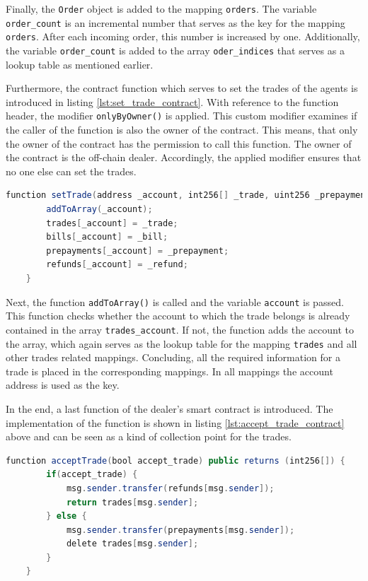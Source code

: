 Finally, the \verb|Order| object is added to the mapping \verb|orders|.
The variable \verb|order_count| is an incremental number that serves as the key for 
the mapping \verb|orders|. After each incoming order, this number is increased by one. 
Additionally, the variable \verb|order_count| is added to the array \verb|oder_indices|
that serves as a lookup table as mentioned earlier.

Furthermore, the contract function which serves to set the trades of the agents is introduced in listing \ref{lst:set_trade_contract}.
With reference to the function header, the modifier \verb|onlyByOwner()| is applied.
This custom modifier examines if the caller of the function is also the owner of the contract. This means, that 
only the owner of the contract has the permission to call this function.
The owner of the contract is the off-chain dealer. Accordingly, the applied modifier ensures that no one else can set 
the trades. 

\begin{lstlisting}[float=htbp, label=lst:set_trade_contract, caption=Setting the trades, language=Java]
    function setTrade(address _account, int256[] _trade, uint256 _prepayment, uint256 _bill, uint256 _refund) public onlyByOwner() {
        addToArray(_account);
        trades[_account] = _trade;
        bills[_account] = _bill;
        prepayments[_account] = _prepayment;
        refunds[_account] = _refund;
    }
\end{lstlisting}

Next, the function \verb|addToArray()| is called and the variable \verb|account| is passed. 
This function checks whether the account to which the trade belongs is already contained in the array \verb|trades_account|.
If not, the function adds the account to the array, which again serves as the lookup table for the
mapping \verb|trades| and all other trades related mappings.
Concluding, all the required information for a trade is placed in the corresponding mappings. In all
mappings the account address is used as the key.

In the end, a last function of the dealer's smart contract is introduced.
The implementation of the function is shown in listing \ref{lst:accept_trade_contract} above
and can be seen as a kind of collection point for the trades.

\begin{lstlisting}[float=htbp, label=lst:accept_trade_contract, caption=Collection point of trades, language=Java]
    function acceptTrade(bool accept_trade) public returns (int256[]) {
        if(accept_trade) {
            msg.sender.transfer(refunds[msg.sender]);
            return trades[msg.sender];
        } else {
            msg.sender.transfer(prepayments[msg.sender]);
            delete trades[msg.sender];
        }
    }
\end{lstlisting}

